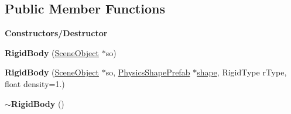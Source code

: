 \subsection*{Public Member Functions}
\begin{Indent}\textbf{ Constructors/\+Destructor}\par
\begin{DoxyCompactItemize}
\item 
\mbox{\label{classrev_1_1_rigid_body_a7a5a3f20ff12ac99795f89b64b24c9a5}} 
{\bfseries Rigid\+Body} (\mbox{\hyperlink{classrev_1_1_scene_object}{Scene\+Object}} $\ast$so)
\item 
\mbox{\label{classrev_1_1_rigid_body_a5e7fa0ef45f25b72a525d91ac298340c}} 
{\bfseries Rigid\+Body} (\mbox{\hyperlink{classrev_1_1_scene_object}{Scene\+Object}} $\ast$so, \mbox{\hyperlink{classrev_1_1_physics_shape_prefab}{Physics\+Shape\+Prefab}} $\ast$\mbox{\hyperlink{classrev_1_1_rigid_body_a9806bd3ece163a62e1b5c57010df9817}{shape}}, Rigid\+Type r\+Type, float density=1.)
\item 
\mbox{\label{classrev_1_1_rigid_body_a74ccf20639a3da740a463303251d58b7}} 
{\bfseries $\sim$\+Rigid\+Body} ()
\end{DoxyCompactItemize}
\end{Indent}
